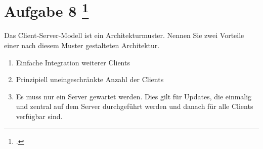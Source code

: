 \documentclass{lehramt-informatik-aufgabe}
\begin{document}
\section{Aufgabe 8
\footcite{examen:66116:2021:03}}

Das Client-Server-Modell ist ein Architekturmuster. Nennen Sie zwei
Vorteile einer nach diesem Muster gestalteten Architektur.

\begin{liAntwort}
\begin{enumerate}
\item Einfache Integration weiterer Clients

\item Prinzipiell uneingeschränkte Anzahl der Clients

\item Es muss  nur ein Server gewartet werden. Dies gilt \zB für
Updates, die einmalig und zentral auf dem Server durchgeführt werden und
danach für alle Clients verfügbar sind.
\end{enumerate}
\end{liAntwort}
\end{document}
